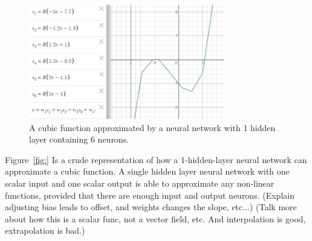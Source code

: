 \documentclass[a4paper, 12pt]{article}
\begin{document}
    \begin{figure}
    \centering
    \includegraphics[height=5cm]{PPT/UniversalApproximationTheorem}
    \caption{A cubic function approximated by a neural network with 1 hidden layer containing 6 neurons.}\label{UniversalApproximationTheorem}
    \end{figure}
    Figure~\ref{fig:} Is a crude representation of how a 1-hidden-layer neural network can approximate a cubic function. A single hidden layer neural network with one scalar input and one scalar output is able to approximate any non-linear functions, provided that there are enough input and output neurons.
    (Explain adjusting bias leads to offset, and weights changes the slope, etc...)
    (Talk more about how this is a scalar func, not a vector field, etc. And interpolation is good, extrapolation is bad.)
\end{document}
